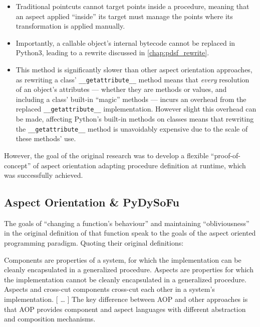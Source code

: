 \begin{itemize}
    \item Traditional pointcuts cannot target points inside a procedure, meaning
    that an aspect applied ``inside'' its target must manage the points where
    its transformation is applied manually.
    \item Importantly, a callable object's internal bytecode cannot be replaced
    in Python3, leading to a rewrite discussed in \cref{chap:pdsf_rewrite}.
    \item This method is significantly slower than other aspect orientation
    approaches, as rewriting a class' \lstinline{__getattribute__} method means
    that \emph{every} resolution of an object's attributes --- whether they are
    methods or values, and including a class' built-in ``magic'' methods ---
    incurs an overhead from the replaced \lstinline{__getattribute__}
    implementation. However slight this overhead can be made, affecting Python's
    built-in methods on classes means that rewriting the
    \lstinline{__getattribute__} method is unavoidably expensive due to the
    scale of these methods' use.
\end{itemize}

However, the goal of the original research was to develop a flexible
``proof-of-concept'' of aspect orientation adapting procedure definition at
runtime, which was successfully
achieved\cite{wallis2018caise,wallis2018genetic}. 

\subsection{Aspect Orientation \& PyDySoFu}\label{subsec:pdsf_aop}

The goals of ``changing a function's behaviour'' and maintaining
``obliviousness'' in the original definition of that function speak to the goals
of the aspect oriented programming paradigm\cite{kiczales1997aspect}. Quoting
their original definitions:

\begin{displayquote}
    Components are properties of a system, for which the implementation can be
    cleanly encapsulated in a generalized procedure. Aspects are properties
    for which the implementation cannot be cleanly encapsulated in a
    generalized procedure. Aspects and cross-cut components cross-cut each other
    in a system’s implementation.
    [ \ldots{} ]
    The key difference between
    AOP and other approaches is that AOP provides component and aspect languages
    with different abstraction and composition mechanisms.
\end{displayquote}

